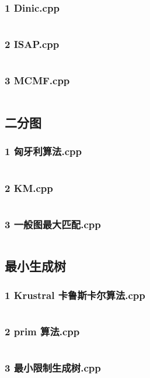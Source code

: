 \documentclass[a4paper,11pt]{article}
\begin{document}
\subsubsection{1 Dinic.cpp}
\inputminted[breaklines]{c++}{"D:/tmplz/templates/图论/Maxflow/1 Dinic.cpp"}
\subsubsection{2 ISAP.cpp}
\inputminted[breaklines]{c++}{"D:/tmplz/templates/图论/Maxflow/2 ISAP.cpp"}
\subsubsection{3 MCMF.cpp}
\inputminted[breaklines]{c++}{"D:/tmplz/templates/图论/Maxflow/3 MCMF.cpp"}
\subsection{二分图}
\subsubsection{1 匈牙利算法.cpp}
\inputminted[breaklines]{c++}{"D:/tmplz/templates/图论/二分图/1 匈牙利算法.cpp"}
\subsubsection{2 KM.cpp}
\inputminted[breaklines]{c++}{"D:/tmplz/templates/图论/二分图/2 KM.cpp"}
\subsubsection{3 一般图最大匹配.cpp}
\inputminted[breaklines]{c++}{"D:/tmplz/templates/图论/二分图/3 一般图最大匹配.cpp"}
\subsection{最小生成树}
\subsubsection{1 Krustral 卡鲁斯卡尔算法.cpp}
\inputminted[breaklines]{c++}{"D:/tmplz/templates/图论/最小生成树/1 Krustral 卡鲁斯卡尔算法.cpp"}
\subsubsection{2 prim 算法.cpp}
\inputminted[breaklines]{c++}{"D:/tmplz/templates/图论/最小生成树/2 prim 算法.cpp"}
\subsubsection{3 最小限制生成树.cpp}
\inputminted[breaklines]{c++}{"D:/tmplz/templates/图论/最小生成树/3 最小限制生成树.cpp"}
\end{document}
